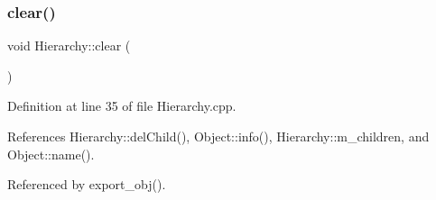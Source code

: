 \subsubsection{\texorpdfstring{clear()}{clear()}}
{\footnotesize\ttfamily void Hierarchy\+::clear (\begin{DoxyParamCaption}{ }\end{DoxyParamCaption})\hspace{0.3cm}{\ttfamily [inherited]}}



Definition at line 35 of file Hierarchy.\+cpp.



References Hierarchy\+::del\+Child(), Object\+::info(), Hierarchy\+::m\+\_\+children, and Object\+::name().



Referenced by export\+\_\+obj().



